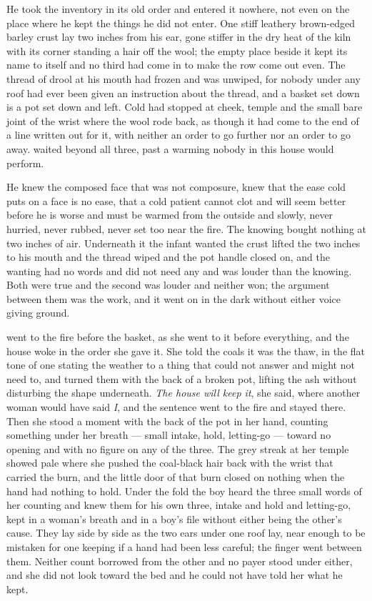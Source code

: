 He took the inventory in its old order and entered it nowhere, not even on the place where he kept the things he did not enter. One stiff leathery brown-edged barley crust lay two inches from his ear, gone stiffer in the dry heat of the kiln with its corner standing a hair off the wool; the empty place beside it kept its name to itself and no third had come in to make the row come out even. The thread of drool at his mouth had frozen and was unwiped, for nobody under any roof had ever been given an instruction about the thread, and a basket set down is a pot set down and left. Cold had stopped at cheek, temple and the small bare joint of the wrist where the wool rode back, as though it had come to the end of a line written out for it, with neither an order to go further nor an order to go away.  waited beyond all three, past a warming nobody in this house would perform.

He knew the composed face that was not composure, knew that the ease cold puts on a face is no ease, that a cold patient cannot clot and will seem better before he is worse and must be warmed from the outside and slowly, never hurried, never rubbed, never set too near the fire. The knowing bought nothing at two inches of air. Underneath it the infant wanted the crust lifted the two inches to his mouth and the thread wiped and the pot handle closed on, and the wanting had no words and did not need any and was louder than the knowing. Both were true and the second was louder and neither won; the argument between them was the work, and it went on in the dark without either voice giving ground.

\scenebreak

 went to the fire before the basket, as she went to it before everything, and the house woke in the order she gave it. She told the coals it was the thaw, in the flat tone of one stating the weather to a thing that could not answer and might not need to, and turned them with the back of a broken pot, lifting the ash without disturbing the shape underneath. \emph{The house will keep it}, she said, where another woman would have said \emph{I}, and the sentence went to the fire and stayed there. Then she stood a moment with the back of the pot in her hand, counting something under her breath --- small intake, hold, letting-go --- toward no opening and with no figure on any of the three. The grey streak at her temple showed pale where she pushed the coal-black hair back with the wrist that carried the burn, and the little door of that burn closed on nothing when the hand had nothing to hold. Under the fold the boy heard the three small words of her counting and knew them for his own three, intake and hold and letting-go, kept in a woman's breath and in a boy's file without either being the other's cause. They lay side by side as the two ears under one roof lay, near enough to be mistaken for one keeping if a hand had been less careful; the finger went between them. Neither count borrowed from the other and no payer stood under either, and she did not look toward the bed and he could not have told her what he kept.

